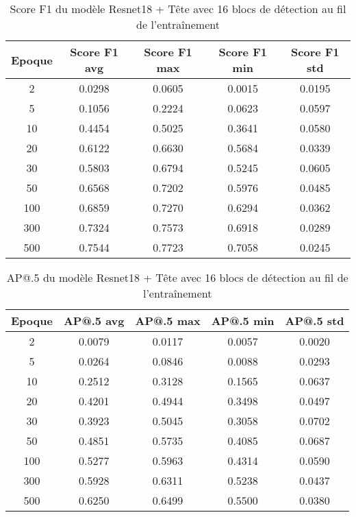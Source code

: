 \begin{table}[!ht]
    \caption{Score F1 du modèle Resnet18 + Tête avec 16 blocs de détection au fil de l'entraînement}
    \label{tab:resnet18+head_16n_f1score}
    \centering
    \begin{tabular}{ |c||c|c|c|c|  }
        \hline
        \rowcolor{gray!50}
        Epoque & Score F1 avg & Score F1 max & Score F1 min & Score F1 std\\
        \hline
        2 & 0.0298 & 0.0605 & 0.0015 & 0.0195\\
        5 & 0.1056 & 0.2224 & 0.0623 & 0.0597\\
        10 & 0.4454 & 0.5025 & 0.3641 & 0.0580\\
        20 & 0.6122 & 0.6630 & 0.5684 & 0.0339\\
        30 & 0.5803 & 0.6794 & 0.5245 & 0.0605\\
        50 & 0.6568 & 0.7202 & 0.5976 & 0.0485\\
        100 & 0.6859 & 0.7270 & 0.6294 & 0.0362\\
        300 & 0.7324 & 0.7573 & 0.6918 & 0.0289\\
        500 & 0.7544 & 0.7723 & 0.7058 & 0.0245\\
        \hline
    \end{tabular}
\end{table}

\begin{table}[!ht]
    \caption{AP@.5 du modèle Resnet18 + Tête avec 16 blocs de détection au fil de l'entraînement}
    \label{tab:resnet18+head_16n_ap50}
    \centering
    \begin{tabular}{ |c||c|c|c|c|  }
        \hline
        \rowcolor{gray!50}
        Epoque & AP@.5 avg & AP@.5 max & AP@.5 min & AP@.5 std\\
        \hline
        2 & 0.0079 & 0.0117 & 0.0057 & 0.0020\\
        5 & 0.0264 & 0.0846 & 0.0088 & 0.0293\\
        10 & 0.2512 & 0.3128 & 0.1565 & 0.0637\\
        20 & 0.4201 & 0.4944 & 0.3498 & 0.0497\\
        30 & 0.3923 & 0.5045 & 0.3058 & 0.0702\\
        50 & 0.4851 & 0.5735 & 0.4085 & 0.0687\\
        100 & 0.5277 & 0.5963 & 0.4314 & 0.0590\\
        300 & 0.5928 & 0.6311 & 0.5238 & 0.0437\\
        500 & 0.6250 & 0.6499 & 0.5500 & 0.0380\\
        \hline
    \end{tabular}
\end{table}

